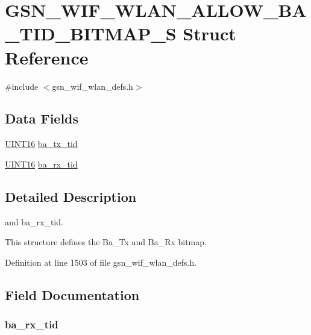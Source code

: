\hypertarget{a00365}{
\section{GSN\_\-WIF\_\-WLAN\_\-ALLOW\_\-BA\_\-TID\_\-BITMAP\_\-S Struct Reference}
\label{a00365}
}


{\ttfamily \#include $<$gsn\_\-wif\_\-wlan\_\-defs.h$>$}

\subsection*{Data Fields}
\begin{DoxyCompactItemize}
\item 
\hyperlink{a00660_ga09f1a1fb2293e33483cc8d44aefb1eb1}{UINT16} \hyperlink{a00365_a8443502fdd39f6ab5b4361996e34f7e3}{ba\_\-tx\_\-tid}
\item 
\hyperlink{a00660_ga09f1a1fb2293e33483cc8d44aefb1eb1}{UINT16} \hyperlink{a00365_a96e93191e693b662134f80f1d7eb3051}{ba\_\-rx\_\-tid}
\end{DoxyCompactItemize}


\subsection{Detailed Description}
and ba\_\-rx\_\-tid.

This structure defines the Ba\_\-Tx and Ba\_\-Rx bitmap. 

Definition at line 1503 of file gsn\_\-wif\_\-wlan\_\-defs.h.



\subsection{Field Documentation}
\hypertarget{a00365_a96e93191e693b662134f80f1d7eb3051}{
\subsubsection[{ba\_\-rx\_\-tid}]{ {\bf ba\_\-rx\_\-tid}}}
\label{a00365_a96e93191e693b662134f80f1d7eb3051}


